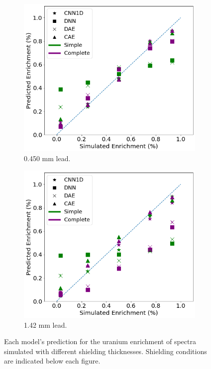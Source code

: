 \begin{figure}[H]
     \begin{subfigure}[b]{0.49\textwidth}
         \centering
         \includegraphics[width=\textwidth]{images/simuranium-mediumlead.png}
         \caption{0.450 mm lead.}
         \label{fig:simuranium-mediumlead}
     \end{subfigure}
     \hfill
     \begin{subfigure}[b]{0.49\textwidth}
         \centering
         \includegraphics[width=\textwidth]{images/simuranium-heavylead.png}
         \caption{1.42 mm lead.}
         \label{fig:simuranium-heavylead}
     \end{subfigure}
        \caption{Each model's prediction for the uranium enrichment of spectra simulated with different shielding thicknesses. Shielding conditions are indicated below each figure.}
        \label{fig:simuranium-shielding}
\end{figure}

